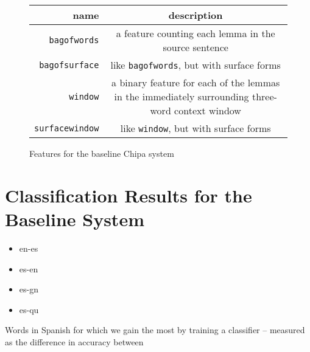 \begin{figure*}
  \begin{centering}
  \begin{tabular}{|r|c|}
    \hline
    name          & description  \\
    \hline
    \texttt{bagofwords}    & a feature counting each lemma in the source sentence \\
    \texttt{bagofsurface}  & like \texttt{bagofwords}, but with surface forms \\
    \texttt{window}       & a binary feature for each of the lemmas in the immediately surrounding three-word context window \\
    \texttt{surfacewindow} & like \texttt{window}, but with surface forms \\
    \hline
  \end{tabular}
  \end{centering}
  \caption{Features for the baseline Chipa system}
  \label{fig:baselinefeatures}
\end{figure*}

\section{Classification Results for the Baseline System}

\begin{itemize}
\item en-es
\item es-en
\item es-gn
\item es-qu
\end{itemize}

Words in Spanish for which we gain the most by training a classifier --
measured as the difference in accuracy between
